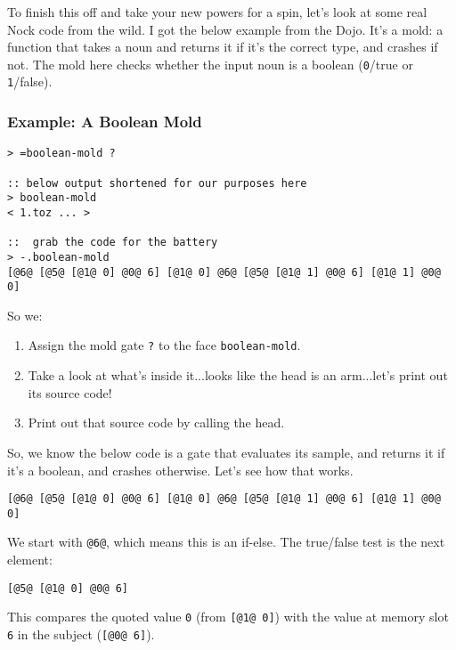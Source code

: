 \documentclass[twoside]{article}
\begin{document}
To finish this off and take your new powers for a spin, let's look at some real Nock code from the wild. I got the below example from the Dojo. It's a mold: a function that takes a noun and returns it if it's the correct type, and crashes if not. The mold here checks whether the input noun is a boolean (\lstinline[style=inlinecode]{0}/true or \lstinline[style=inlinecode]{1}/false).

\subsubsection{Example: A Boolean Mold}

\begin{lstlisting}[style=listingcode]
> =boolean-mold ?

:: below output shortened for our purposes here
> boolean-mold
< 1.toz ... >

::  grab the code for the battery
> -.boolean-mold
[@6@ [@5@ [@1@ 0] @0@ 6] [@1@ 0] @6@ [@5@ [@1@ 1] @0@ 6] [@1@ 1] @0@ 0]
\end{lstlisting}

\noindent{}
So we:


\begin{enumerate}
  \item  Assign the mold gate \lstinline[style=inlinecode]{?} to the face \lstinline[style=inlinecode]{boolean-mold}.
  \item  Take a look at what's inside it...looks like the head is an arm...let's print out its source code!
  \item  Print out that source code by calling the head.
\end{enumerate}

So, we know the below code is a gate that evaluates its sample, and returns it if it's a boolean, and crashes otherwise. Let's see how that works.

\begin{lstlisting}[style=listingcode]
[@6@ [@5@ [@1@ 0] @0@ 6] [@1@ 0] @6@ [@5@ [@1@ 1] @0@ 6] [@1@ 1] @0@ 0]
\end{lstlisting}

\noindent{}
We start with \lstinline[style=inlinecode]{@6@}, which means this is an if-else. The true/false test is the next element:

\begin{lstlisting}[style=listingcode]
[@5@ [@1@ 0] @0@ 6]
\end{lstlisting}

This compares the quoted value \lstinline[style=inlinecode]{0} (from \lstinline[style=inlinecode]{[@1@ 0]}) with the value at memory slot \lstinline[style=inlinecode]{6} in the subject (\lstinline[style=inlinecode]{[@0@ 6]}).
\end{document}
